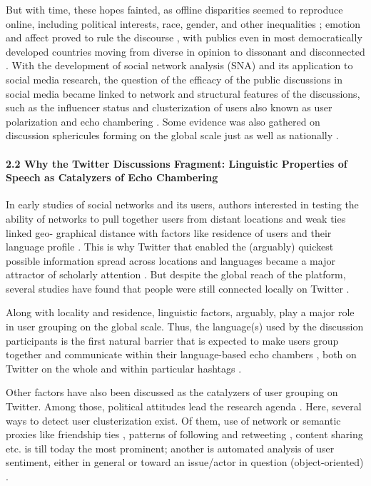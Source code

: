 But with time, these hopes fainted, as offline disparities seemed to reproduce online, including political interests, race, gender, and other inequalities \cite{Daniels}; emotion and affect proved to rule the discourse \cite{Papacharissi}, with publics even in most democratically developed countries moving from diverse in opinion to dissonant and disconnected \cite{Pfetsch}. With the development of social network analysis (SNA) and its application to social media research, the question of the efficacy of the public discussions in social media \cite{BrunsHighfield} became linked to network and structural features of the discussions, such as the influencer status \cite{BodrunovaBlekanovMaksimov,BodrunovaLitvinenkoBlekanov2016} and clusterization of users also known as user polarization \cite{BarberaJostNagler,BastosMerceaBaronchelli} and echo chambering \cite{ColleoniRozzaArvidsson,ConoverRatkiewiczFrancisco}. Some evidence was also gathered on discussion sphericules forming on the global scale just as well as nationally \cite{CammaertsAudenhove}.

\paragraph{2.2 Why the Twitter Discussions Fragment: Linguistic Properties of Speech as Catalyzers of Echo Chambering}
In early studies of social networks and its users, authors interested in testing the ability of networks to pull together users from distant locations and weak ties linked geo- graphical distance with factors like residence of users and their language profile \cite{TakhteyevGruzdWellman}. This is why Twitter that enabled the (arguably) quickest possible information spread across locations and languages became a major attractor of scholarly attention \cite{LotanGraeffAnanny,HongConvertinoChi}. But despite the global reach of the platform, several studies have found that people were still connected locally on Twitter \cite{CammaertsAudenhove,YardiBoyd}.

Along with locality and residence, linguistic factors, arguably, play a major role in user grouping on the global scale. Thus, the language(s) used by the discussion participants is the first natural barrier that is expected to make users group together and communicate within their language-based echo chambers \cite{ChenTuZheng}, both on Twitter on the whole and within particular hashtags \cite{BastosPuschmannTravitzki}.

Other factors have also been discussed as the catalyzers of user grouping on Twitter. Among those, political attitudes lead the research agenda \cite{BarberaJostNagler,BastosMerceaBaronchelli}. Here, several ways to detect user clusterization exist. Of them, use of network or semantic proxies like friendship ties \cite{BarberaRivero}, patterns of following \cite{Rivero} and retweeting \cite{CalaisGuerraMeiraJrCardie}, content sharing \cite{ColleoniRozzaArvidsson,BakshyMessingAdamic} etc. is till today the most prominent; another is automated analysis of user sentiment, either in general or toward an issue/actor in question (object-oriented) \cite{ConoverGoncalvesRatkiewicz}.

